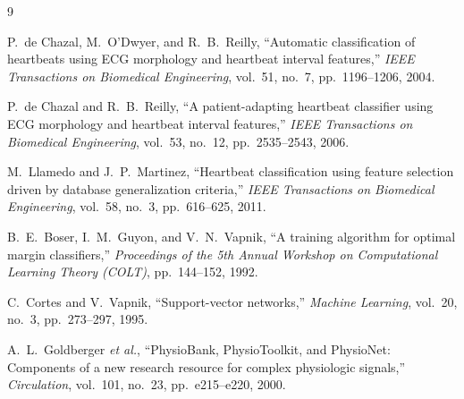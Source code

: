 \documentclass[11pt]{article}
\begin{document}
\begin{thebibliography}{9}

P.\ de Chazal, M.\ O'Dwyer, and R.\ B.\ Reilly,
``Automatic classification of heartbeats using ECG morphology and heartbeat interval features,''
\emph{IEEE Transactions on Biomedical Engineering}, vol.\ 51, no.\ 7,
pp.\ 1196--1206, 2004.

P.\ de Chazal and R.\ B.\ Reilly,
``A patient-adapting heartbeat classifier using ECG morphology and heartbeat interval features,''
\emph{IEEE Transactions on Biomedical Engineering}, vol.\ 53, no.\ 12,
pp.\ 2535--2543, 2006.

M.\ Llamedo and J.\ P.\ Martinez,
``Heartbeat classification using feature selection driven by database generalization criteria,''
\emph{IEEE Transactions on Biomedical Engineering}, vol.\ 58, no.\ 3,
pp.\ 616--625, 2011.

B.\ E.\ Boser, I.\ M.\ Guyon, and V.\ N.\ Vapnik,
``A training algorithm for optimal margin classifiers,''
\emph{Proceedings of the 5th Annual Workshop on Computational Learning Theory (COLT)},
pp.\ 144--152, 1992.

C.\ Cortes and V.\ Vapnik,
``Support-vector networks,''
\emph{Machine Learning}, vol.\ 20, no.\ 3, pp.\ 273--297, 1995.

A.\ L.\ Goldberger \emph{et al.},
``PhysioBank, PhysioToolkit, and PhysioNet: Components of a new research resource for complex physiologic signals,''
\emph{Circulation}, vol.\ 101, no.\ 23, pp.\ e215--e220, 2000.

\end{thebibliography}
\end{document}

